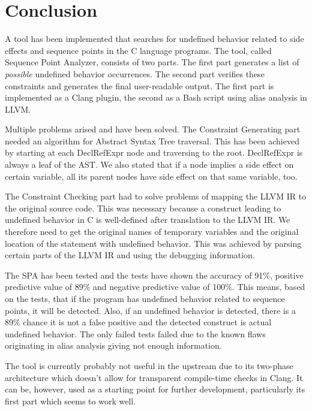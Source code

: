 \chapter{Conclusion}
A tool has been implemented that searches for undefined behavior related to side effects and sequence points in the C language programs. The tool, called Sequence Point Analyzer, consists of two parts. The first part generates a list of \emph{possible} undefined behavior occurrences. The second part verifies these constraints and generates the final user-readable output. The first part is implemented as a Clang plugin, the second as a Bash script using alias analysis in LLVM.

Multiple problems arised and have been solved. The Constraint Generating part needed an algorithm for Abstract Syntax Tree traversal. This has been achieved by starting at each DeclRefExpr node and traversing to the root. DeclRefExpr is always a leaf of the AST. We also stated that if a node implies a side effect on certain variable, all its parent nodes have side effect on that same variable, too.

The Constraint Checking part had to solve problems of mapping the LLVM IR to the original source code. This was necessary because a construct leading to undefined behavior in C is well-defined after translation to the LLVM IR. We therefore need to get the original names of temporary variables and the original location of the statement with undefined behavior. This was achieved by parsing certain parts of the LLVM IR and using the debugging information.

The SPA has been tested and the tests have shown the accuracy of 91\%, positive predictive value of 89\% and negative predictive value of 100\%. This means, based on the tests, that if the program has undefined behavior related to sequence points, it will be detected. Also, if an undefined behavior is detected, there is a 89\% chance it is not a false positive and the detected construct is actual undefined behavior. The only failed tests failed due to the known flaws  originating in alias analysis giving not enough information.

The tool is currently probably not useful in the upstream due to its two-phase architecture which doesn't allow for transparent compile-time checks in Clang. It can be, however, used as a starting point for further development, particularly its first part which seems to work well.
